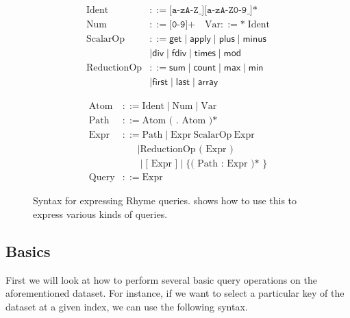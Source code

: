 \documentclass[runningheads]{llncs}
\newcommand{\lang}{Rhyme}
\begin{document}
\begin{figure}[t!]
\scriptsize
\begin{minipage}{0.5\textwidth}
\begin{align*}
\text{Ident} &::= \texttt{[a-zA-Z\_][a-zA-Z0-9\_]*} \\
\text{Num} & ::= \texttt{[0-9]+} \quad \text{Var} ::= \texttt{*}\;\text{Ident} \\
\text{ScalarOp} &::= \textsf{get} \mid \textsf{apply} \mid \textsf{plus} \mid \textsf{minus} \\ 
&\mid \textsf{div} \mid \textsf{fdiv} \mid \textsf{times} \mid \textsf{mod} \\ 
\text{ReductionOp} &::= \textsf{sum} \mid \textsf{count} \mid \textsf{max} \mid \textsf{min} \\ 
&\mid \textsf{first} \mid \textsf{last} \mid \textsf{array}
\end{align*}
\end{minipage}%
\begin{minipage}{0.5\textwidth}
\begin{align*}
\text{Atom} &::= \text{Ident} \mid \text{Num} \mid \text{Var} \\
\text{Path} &::= \text{Atom ( . Atom )*} \\
\text{Expr} &::= \text{Path} \mid \text{Expr} \ \text{ScalarOp} \ \text{Expr} \\
&\quad\;\; \mid \text{ReductionOp ( Expr )} \\
&\quad\;\; \mid \text{[ Expr ]} \mid \text{\{ ( Path : Expr )* \}} \\
\text{Query} &::= \text{Expr}
\end{align*}
\end{minipage}

\caption{Syntax for expressing \lang{} queries.  shows how to use this to express
various kinds of queries.}\label{fig:grammar}
\vspace{-5mm}
\end{figure}

\vspace{-4mm}
\subsection{Basics}
\vspace{-2mm}
First we will look at how to perform several basic query operations on the
aforementioned dataset.
For instance, if we want to select a particular key of the dataset at a given
index, we can use the following syntax.
\end{document}
